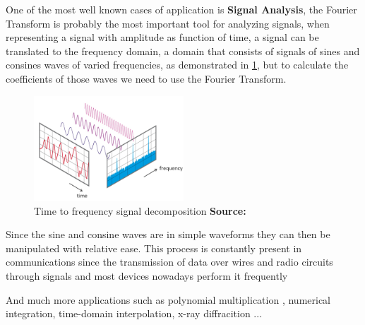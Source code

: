 \documentclass[
  oneside,
  11pt, a4paper,
  footinclude=true,
  headinclude=true,
  cleardoublepage=empty
]{scrbook}
\newcommand*{\source}[1]{%
    \textbf{Source:} \cite{#1}%
}
\begin{document}
One of the most well known cases of application is \textbf{Signal Analysis}, the Fourier Transform is probably the most important tool for analyzing signals, when representing a signal with amplitude as function of time, a signal can be translated to the frequency domain, a domain that consists of signals of sines and consines waves of varied frequencies, as demonstrated in \ref{fig:signal-decomposition}, but to calculate the coefficients of those waves we need to use the Fourier Transform.

\begin{figure}[h] 
    \centering
    \includegraphics[width=0.5\textwidth]{imgs/fft_time_freq.png}
    \caption{Time to frequency signal decomposition \source{fftntiaudio}}
    \label{fig:signal-decomposition}
\end{figure}

Since the sine and consine waves are in simple waveforms they can then be manipulated with relative ease. This process is constantly present in communications since the transmission of data over wires and radio circuits through signals and most devices nowadays perform it frequently



And much more applications such as polynomial multiplication \cite{jia2014polynomial}, numerical integration, time-domain interpolation, x-ray diffracition ...

  
\end{document}
